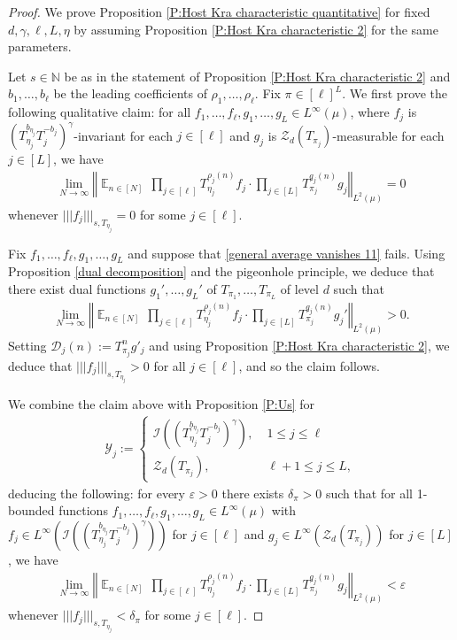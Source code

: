 \documentclass[11pt]{amsart}
\theoremstyle{definition}
\newcommand{\N}{{\mathbb N}}
\newcommand{\CD}{{\mathcal D}}
\newcommand{\CI}{{\mathcal I}}
\newcommand{\CY}{{\mathcal Y}}
\newcommand{\CZ}{{\mathcal Z}}
\newcommand{\norm}[1]{\left\Vert #1\right\Vert}
\newcommand{\nnorm}[1]{\lvert\!|\!| #1|\!|\!\rvert}
\DeclareMathOperator*{\E}{\mathbb{E}}
\newcommand{\brac}[1]{\mathopen{}\left( #1 \mathclose{}\right)}
\begin{document}
\begin{proof}
	We prove Proposition \ref{P:Host Kra characteristic quantitative} for fixed $d, \gamma, \ell, L, \eta$ by assuming Proposition \ref{P:Host Kra characteristic 2} for the same parameters.
	
	Let $s\in\N$ be as in the statement of Proposition \ref{P:Host Kra characteristic 2} and $b_1, \ldots, b_\ell$ be the leading coefficients of $\rho_1, \ldots, \rho_\ell$. Fix $\pi\in[\ell]^L$. We first prove the following qualitative claim: for all  $f_1, \ldots, f_\ell, g_1, \ldots, g_L\in L^\infty(\mu)$, where $f_j$ is $\brac{T_{\eta_j}^{b_{\eta_j}}T_j^{-b_j}}^\gamma$-invariant  for each $j\in[\ell]$ and $g_j$ is $\CZ_d(T_{\pi_j})$-measurable for each $j\in[L]$, we have
	\begin{align}\label{general average vanishes 11}
		\lim_{N\to\infty}\norm{\E_{n\in [N]} \,\prod_{j\in[\ell]}T_{\eta_j}^{\rho_j(n)}f_j \cdot  \prod_{j\in[L]}T^{q_j(n)}_{\pi_j}g_j}_{L^2(\mu)} = 0
	\end{align}
	whenever $\nnorm{f_j}_{s, T_{\eta_j}} = 0$ for some $j\in[\ell]$.
	
	Fix $f_1, \ldots, f_\ell, g_1, \ldots, g_L$ and suppose that \eqref{general average vanishes 11} fails. Using Proposition \ref{dual decomposition} and the pigeonhole principle, we deduce that there exist dual functions $g_1', \ldots, g_L'$ of $T_{\pi_1}, \ldots, T_{\pi_L}$ of level $d$ such that
	\begin{align*}
		\lim_{N\to\infty}\norm{\E_{n\in [N]} \,\prod_{j\in[\ell]}T_{\eta_j}^{\rho_j(n)}f_j \cdot  \prod_{j\in[L]}T^{q_j(n)}_{\pi_j}g_j'}_{L^2(\mu)} > 0.
	\end{align*}
	Setting $\CD_j(n) := T_{\pi_j}^{n}g'_j$ and using Proposition \ref{P:Host Kra characteristic 2}, we deduce that $\nnorm{f_j}_{s, T_{\eta_j}}>0$ for all $j\in[\ell]$, and so the claim follows.
	
	We combine the claim above with Proposition \ref{P:Us} for
	\begin{align*}
	    \CY_j := \begin{cases} \CI\brac{\brac{T_{\eta_j}^{b_{\eta_j}}T_j^{-b_j}}^\gamma},\; &1\leq j \leq \ell\\
	    \CZ_d(T_{\pi_j}),\; &\ell+1\leq j \leq L,
	    \end{cases}
	\end{align*}
    deducing the following: for every $\varepsilon>0$ there exists $\delta_\pi>0$ such that for all 1-bounded functions $f_1, \ldots, f_\ell, g_1, \ldots, g_L\in L^\infty(\mu)$ with $f_j\in L^\infty\brac{\CI\brac{\brac{T_{\eta_j}^{b_{\eta_j}}T_j^{-b_j}}^\gamma}}$ for $j\in[\ell]$ and $g_j\in L^\infty(\CZ_d(T_{\pi_j}))$ for $j\in [L]$, we have
	\begin{align*}
		\lim_{N\to\infty}\norm{\E_{n\in [N]} \,\prod_{j\in[\ell]}T_{\eta_j}^{\rho_j(n)}f_j \cdot  \prod_{j\in[L]}T^{q_j(n)}_{\pi_j}g_j}_{L^2(\mu)} < \varepsilon
	\end{align*}
	whenever $\nnorm{f_j}_{s, T_{\eta_j}} <\delta_\pi$ for some $j\in[\ell]$.
	

\end{proof}
\end{document}
